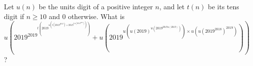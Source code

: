 Let $u(n)$ be the units digit of a positive integer $n$, and let $t(n)$ be its tens digit if $n\ge10$ and $0$ otherwise. What is $\displaystyle u\left(2019^{2019^{t\left(2019^{u(t(2019^{2019}) \times 2019^{t(u(2019^{2018})})}\right)}}+u\left(2019^{u(u(2019)^{u(2019^{2019 u(2019)})}) \times u(u(2019^{2018})^{2019})}\right)\right)$?
